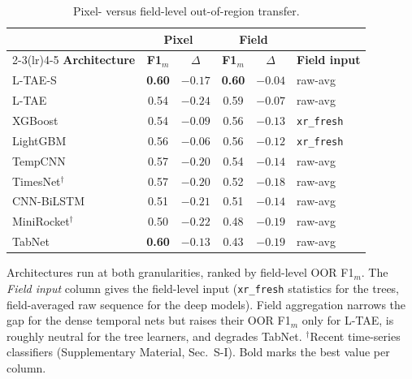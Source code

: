 \documentclass[preprint,authoryear]{elsarticle}
\begin{document}
\begin{table}[!t]
\centering
\caption{Pixel- versus field-level out-of-region transfer.}
\label{tab:pixfield}
\renewcommand{\arraystretch}{1.1}
\setlength{\tabcolsep}{3.5pt}
\footnotesize
\begin{tabular}{lccccl}
\toprule
 & \multicolumn{2}{c}{\textbf{Pixel}} & \multicolumn{2}{c}{\textbf{Field}} & \\
\cmidrule(lr){2-3}\cmidrule(lr){4-5}
\textbf{Architecture} & \textbf{F1$_m$} & \textbf{$\Delta$} & \textbf{F1$_m$} & \textbf{$\Delta$} & \textbf{Field input} \\
\midrule
L-TAE-S    & \textbf{0.60} & $-0.17$         & \textbf{0.60} & $\mathbf{-0.04}$ & raw-avg \\
L-TAE      & 0.54          & $-0.24$         & 0.59          & $-0.07$         & raw-avg \\
XGBoost    & 0.54          & $-0.09$         & 0.56          & $-0.13$         & \texttt{xr\_fresh} \\
LightGBM   & 0.56          & $\mathbf{-0.06}$ & 0.56          & $-0.12$         & \texttt{xr\_fresh} \\
TempCNN    & 0.57          & $-0.20$         & 0.54          & $-0.14$         & raw-avg \\
TimesNet$^{\dagger}$ & 0.57 & $-0.20$ & 0.52 & $-0.18$ & raw-avg \\
CNN-BiLSTM & 0.51          & $-0.21$         & 0.51          & $-0.14$         & raw-avg \\
MiniRocket$^{\dagger}$ & 0.50 & $-0.22$ & 0.48 & $-0.19$ & raw-avg \\
TabNet     & \textbf{0.60} & $-0.13$         & 0.43          & $-0.19$         & raw-avg \\
\bottomrule
\end{tabular}
\par\vspace{3pt}
\begin{minipage}{\linewidth}
\footnotesize
Architectures run at both granularities, ranked by field-level OOR F1$_m$. The \emph{Field input} column gives the field-level input (\texttt{xr\_fresh} statistics for the trees, field-averaged raw sequence for the deep models). Field aggregation narrows the gap for the dense temporal nets but raises their OOR F1$_m$ only for L-TAE, is roughly neutral for the tree learners, and degrades TabNet. $^{\dagger}$Recent time-series classifiers (Supplementary Material, Sec.~S-I). Bold marks the best value per column.
\end{minipage}
\end{table}
\end{document}
